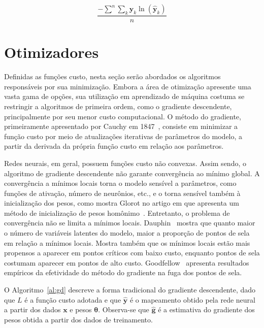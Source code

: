 \begin{equation} \label{eq:cec}
    \frac{-\displaystyle\sum^n \sum_k \mathbf{y}_k \ln(\mathbf{\hat{y}}_k)}{n}
\end{equation}

\section{Otimizadores} \label{sec:optimizers}

Definidas as funções custo, nesta seção serão abordados os algoritmos responsáveis por sua minimização. Embora a área de otimização apresente uma vasta gama de opções, sua utilização em aprendizado de máquina costuma se restringir a algoritmos de primeira ordem, como o gradiente descendente, principalmente por seu menor custo computacional. O método do gradiente, primeiramente apresentado por Cauchy em 1847~\cite{cauchy1847}, consiste em minimizar a função custo por meio de atualizações iterativas de parâmetros do modelo, a partir da derivada da própria função custo em relação aos parâmetros.

Redes neurais, em geral, possuem funções custo não convexas. Assim sendo, o algoritmo de gradiente descendente não garante convergência ao mínimo global. A convergência a mínimos locais torna o modelo sensível a parâmetros, como funções de ativação, número de neurônios, etc., e o torna sensível também à inicialização dos pesos, como mostra Glorot no artigo em que apresenta um método de inicialização de pesos homônimo~\cite{glorot10}. Entretanto, o problema de convergência não se limita a mínimos locais. Dauphin~\cite{dauphin14} mostra que quanto maior o número de variáveis latentes do modelo, maior a proporção de pontos de sela em relação a mínimos locais. Mostra também que os mínimos locais estão mais propensos a aparecer em pontos críticos com baixo custo, enquanto pontos de sela costumam aparecer em pontos de alto custo. Goodfellow~\cite{goodfellow14} apresenta resultados empíricos da efetividade do método do gradiente na fuga dos pontos de sela.

O Algoritmo~\ref{al:gd} descreve a forma tradicional do gradiente descendente, dado que $L$ é a função custo adotada e que $\mathbf{\hat{y}}$ é o mapeamento obtido pela rede neural a partir dos dados $\mathbf{x}$ e pesos $\boldsymbol{\theta}$. Observa-se que $\mathbf{\hat{g}}$ é a estimativa do gradiente dos pesos obtida a partir dos dados de treinamento.

